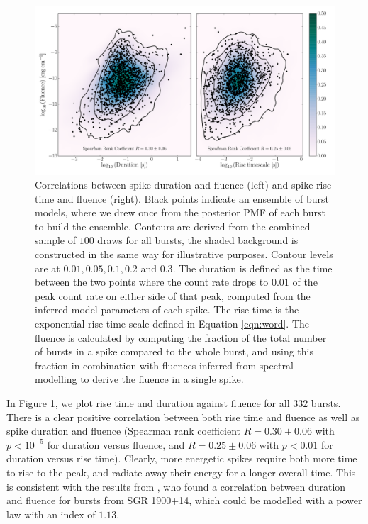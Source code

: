 \documentclass[12pt]{emulateapj}
\begin{document}
 \begin{figure}[htbp]
\begin{center}
\includegraphics[width=\textwidth]{sgr1550_correlations.pdf}
\caption{Correlations between spike duration and fluence (left) and spike rise time and fluence (right). Black points indicate an ensemble of burst models, where we drew once
from the posterior PMF of each burst to build the ensemble. Contours are derived from the combined sample of $100$ draws for all bursts, the shaded background is constructed in
the same way for illustrative purposes. Contour levels are at $0.01, 0.05, 0.1, 0.2$ and $0.3$.
The duration is defined as the time between the two points where
the count rate drops to $0.01$ of the peak count rate on either side of that peak, computed from the inferred model parameters of each spike. The rise time is the exponential
rise time scale defined in Equation \ref{eqn:word}. The fluence is calculated by computing the fraction of the total number of bursts in a spike compared to the whole burst, and using
this fraction in combination with fluences inferred from spectral modelling\citep{vanderhorst2012,vonkienlin2012} to derive the fluence in a single spike.}
\label{fig:correlations}
\end{center}
\end{figure}

In Figure \ref{fig:correlations}, we plot rise time and duration against fluence for all $332$ bursts. There is a clear positive
correlation between both rise time and fluence as well as spike duration and fluence (Spearman rank coefficient $R = 0.30\pm0.06$ with $p < 10^{-5}$ for duration versus fluence,
and $R = 0.25\pm0.06$ with $p < 0.01$ for duration versus rise time). Clearly, more energetic spikes require both more time to rise to the peak,
and radiate away their energy for a longer overall time. This is consistent with the results from \citep{gogus1999}, who found a correlation between
duration and fluence for bursts from SGR 1900+14, which could be modelled with a power law with an index of $1.13$. 
\end{document}
